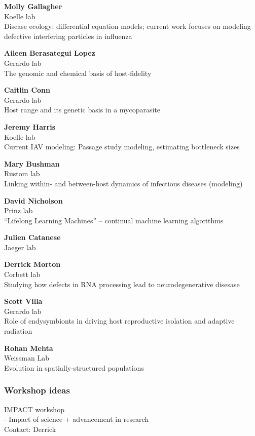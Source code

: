 \documentclass[10,portrait]{article}
\begin{document}
\textbf{Molly Gallagher}\\
Koelle lab\\
Disease ecology; differential equation models; current work focuses on
modeling defective interfering particles in influenza

\textbf{Aileen Berasategui Lopez}\\
Gerardo lab\\
The genomic and chemical basis of host-fidelity

\textbf{Caitlin Conn}\\
Gerardo lab\\
Host range and its genetic basis in a mycoparasite

\textbf{Jeremy Harris}\\
Koelle lab\\
Current IAV modeling: Passage study modeling, estimating bottleneck
sizes

\textbf{Mary Bushman}\\
Rustom lab\\
Linking within- and between-host dynamics of infectious diseases
(modeling)

\textbf{David Nicholson}\\
Prinz lab\\
``Lifelong Learning Machines'' -- continual machine learning algorithms

\textbf{Julien Catanese}\\
Jaeger lab

\textbf{Derrick Morton}\\
Corbett lab\\
Studying how defects in RNA processing lead to neurodegenerative
disesase

\textbf{Scott Villa}\\
Gerardo lab\\
Role of endysymbionts in driving host reproductive isolation and
adaptive radiation

\textbf{Rohan Mehta}\\
Weissman Lab\\
Evolution in spatially-structured populations

\subsubsection{Workshop ideas}\label{workshop-ideas}

IMPACT workshop\\
- Impact of science + advancement in research\\
Contact: Derrick
\end{document}
